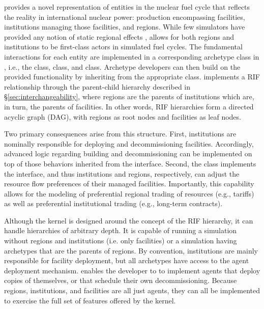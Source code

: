 \Cyclus provides a novel representation of entities in the nuclear fuel cycle
that reflects the reality in international nuclear power: production
encompassing facilities, institutions managing those facilities, and regions. While
few simulators have provided any notion of static regional
effects \cite{huff_next_2010,juchau_modeling_2010}, \Cyclus allows for both regions and institutions to be first-class
actors in simulated fuel cycles. The fundamental interactions for each entity are implemented in a corresponding
archetype class in \Cyclus, i.e., the  class, 
class, and  class. Archetype developers can then build on the
provided functionality by inheriting from the appropriate class.
\Cyclus implements a \gls{RIF} relationship through the
parent-child hierarchy described in \S \ref{sec:interchangeability}, where
regions are the parents of institutions which are, in turn, the parents of
facilities. In other words, \gls{RIF} hierarchies form a directed acyclic graph (DAG),
with regions as root nodes and facilities as leaf nodes.

Two primary consequences arise from this structure. First, institutions are
nominally
responsible for deploying and decommissioning facilities. Accordingly, advanced
logic regarding building and decommissioning can be implemented on top of
those behaviors inherited from the
 interface. Second, the  class implements the
 interface, and thus institutions and regions, respectively, can
adjust the resource flow preferences of their managed facilities. Importantly,
this capability allows for the modeling of preferential regional trading
of resources (e.g., tariffs) as well as preferential institutional trading
(e.g., long-term contracts).


Although the \Cyclus kernel is designed around the concept of the \gls{RIF} hierarchy,
it can handle hierarchies of arbitrary depth.  It is capable of
running a simulation without regions and institutions (i.e.  only facilities)
or a simulation having archetypes that are the parents of regions.  By
convention, institutions are mainly responsible for facility deployment, but
all archetypes have access to the agent deployment mechanism. \Cyclus enables
the developer to to implement agents that deploy copies of themselves, or that
schedule their own decommissioning.  Because regions, institutions, and
facilities are all just agents, they can all be implemented to exercise the
full set of features offered by the \Cyclus kernel.

